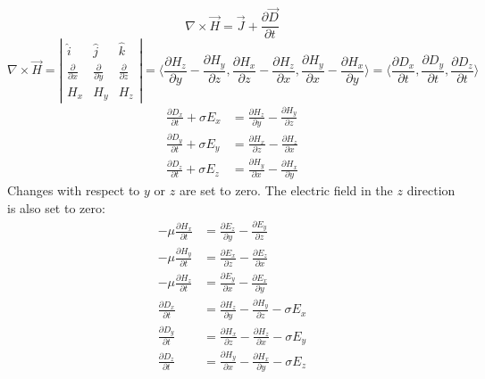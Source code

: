 \documentclass{article}
\begin{document}
        \[  
            \nabla \times \overrightarrow{H}
            =
            \overrightarrow{J}
            +
            \frac{\partial\overrightarrow{D}}{\partial t}
        \]
        \[
            \nabla\times\overrightarrow{H}
            =
            \left|
                \begin{matrix}
                    \hat{i} & \hat{j} & \hat{k}\\
                    \frac{\partial}{\partial x} &\frac{\partial}{\partial y} &\frac{\partial}{\partial z} \\
                    H_x &H_y & H_z
                \end{matrix}
            \right|
            =
            \langle
                \frac{\partial H_z}{\partial y}
                -
                \frac{\partial H_y}{\partial z}
                ,
                \frac{\partial H_x}{\partial z}
                -
                \frac{\partial H_z}{\partial x}
                ,
                \frac{\partial H_y}{\partial x}
                -
                \frac{\partial H_x}{\partial y}
            \rangle
            =
            \langle
                \frac{\partial D_x}{\partial t},
                \frac{\partial D_y}{\partial t},
                \frac{\partial D_z}{\partial t}
            \rangle
        \]
        \begin{align}
            \frac{\partial D_x}{\partial t}+\sigma E_x&=\frac{\partial H_z}{\partial y}-\frac{\partial H_y}{\partial z}\\
            \frac{\partial D_y}{\partial t}+\sigma E_y&=\frac{\partial H_x}{\partial z}-\frac{\partial H_z}{\partial x}\\
            \frac{\partial D_z}{\partial t}+\sigma E_z&=\frac{\partial H_y}{\partial x}-\frac{\partial H_x}{\partial y}
        \end{align}
        Changes with respect to $y$ or $z$ are set to zero.
        The electric field in the $z$ direction is also set to zero:
        \begin{align*}
            -\mu\frac{\partial H_x}{\partial t}&=\frac{\partial E_z}{\partial y}-\frac{\partial E_y}{\partial z}\\
            -\mu\frac{\partial H_y}{\partial t}&=\frac{\partial E_x}{\partial z}-\frac{\partial E_z}{\partial x}\\
            -\mu\frac{\partial H_z}{\partial t}&=\frac{\partial E_y}{\partial x}-\frac{\partial E_x}{\partial y}\\
            \frac{\partial D_x}{\partial t}&=\frac{\partial H_z}{\partial y}-\frac{\partial H_y}{\partial z}-\sigma E_x\\
            \frac{\partial D_y}{\partial t}&=\frac{\partial H_x}{\partial z}-\frac{\partial H_z}{\partial x}-\sigma E_y\\
            \frac{\partial D_z}{\partial t}&=\frac{\partial H_y}{\partial x}-\frac{\partial H_x}{\partial y}-\sigma E_z
        \end{align*}
\end{document}
